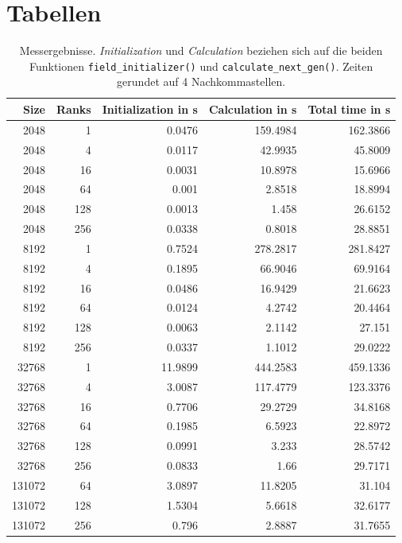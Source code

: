 \documentclass[german,plainarticle,hyperref,utf8]{zihpub}
\begin{document}
	\section{Tabellen} \label{tables}
	\begin{table}[h]
		\centering
			\begin{tabular}{|| r r r r r ||}
				\hline
				Size & Ranks & Initialization in s & Calculation in s & Total time in s \\ [1ex]
				\hline\hline
				2048 & 1 & 0.0476 & 159.4984 & 162.3866 \\ \hline
				2048 & 4 & 0.0117 & 42.9935 & 45.8009 \\ \hline
				2048 & 16 & 0.0031 & 10.8978 & 15.6966 \\ \hline
				2048 & 64 & 0.001 & 2.8518 & 18.8994 \\ \hline
				2048 & 128 & 0.0013 & 1.458 & 26.6152 \\ \hline
				2048 & 256 & 0.0338 & 0.8018 & 28.8851 \\ \hline \hline
				8192 & 1 & 0.7524 & 278.2817 & 281.8427 \\ \hline
				8192 & 4 & 0.1895 & 66.9046 & 69.9164 \\ \hline
				8192 & 16 & 0.0486 & 16.9429 & 21.6623 \\ \hline
				8192 & 64 & 0.0124 & 4.2742 & 20.4464 \\ \hline
				8192 & 128 & 0.0063 & 2.1142 & 27.151 \\ \hline
				8192 & 256 & 0.0337 & 1.1012 & 29.0222 \\ \hline \hline
				32768 & 1 & 11.9899 & 444.2583 & 459.1336 \\ \hline
				32768 & 4 & 3.0087 & 117.4779 & 123.3376 \\ \hline
				32768 & 16 & 0.7706 & 29.2729 & 34.8168 \\ \hline
				32768 & 64 & 0.1985 & 6.5923 & 22.8972 \\ \hline
				32768 & 128 & 0.0991 & 3.233 & 28.5742 \\ \hline
				32768 & 256 & 0.0833 & 1.66 & 29.7171 \\ \hline \hline
				131072 & 64 & 3.0897 & 11.8205 & 31.104 \\ \hline
				131072 & 128 & 1.5304 & 5.6618 & 32.6177 \\ \hline
				131072 & 256 & 0.796 & 2.8887 & 31.7655 \\ \hline
			\end{tabular}
			\caption{Messergebnisse. \textit{Initialization} und \textit{Calculation} beziehen sich auf die beiden Funktionen \texttt{field\_initializer()} und \texttt{calculate\_next\_gen()}. Zeiten gerundet auf 4 Nachkommastellen.}
	\end{table}
	\clearpage
	
\end{document}
